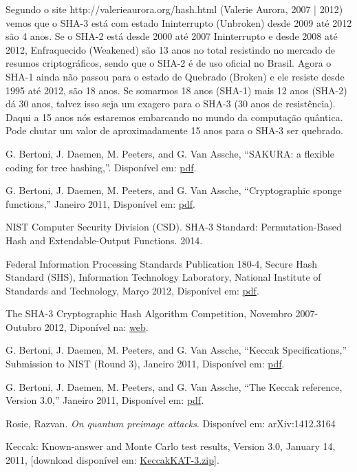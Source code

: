 \documentclass[12pt, a4paper]{article}
\begin{document}
\begin{enumerate}
\begin{enumerate}
    Segundo o site http://valerieaurora.org/hash.html (Valerie Aurora, 2007 |
    2012) vemos que o SHA-3 está com estado Ininterrupto (Unbroken) desde 2009
    até 2012 são 4 anos. Se o SHA-2 está desde 2000 até 2007 Ininterrupto e
    desde 2008 até 2012, Enfraquecido (Weakened) são 13 anos no total resistindo
    no mercado de resumos criptográficos, sendo que o SHA-2 é de uso oficial no
    Brasil. Agora o SHA-1 ainda não passou para o estado de Quebrado (Broken) e
    ele resiste desde 1995 até 2012, são 18 anos. Se somarmos 18 anos (SHA-1)
    mais 12 anos (SHA-2) dá 30 anos, talvez isso seja um exagero para o SHA-3
    (30 anos de resistência). Daqui a 15 anos nós estaremos embarcando no mundo
    da computação quântica. Pode chutar um valor de aproximadamente 15 anos para
    o SHA-3 ser quebrado.

  \end{enumerate}

\end{enumerate}

\pagebreak
\begin{thebibliography}{9}
 G. Bertoni, J. Daemen, M. Peeters, and G. Van Assche, “SAKURA:
a flexible coding for tree hashing,”. Disponível em:
\href{http://keccak.noekeon.org/Sakura.pdf}{pdf}.

 G. Bertoni, J. Daemen, M. Peeters, and G. Van Assche,
“Cryptographic sponge functions,” Janeiro 2011, Disponível em:
\href{http://sponge.noekeon.org/CSF-0.1.pdf}{pdf}.

 NIST Computer Security Division (CSD). SHA-3 Standard:
Permutation-Based Hash and Extendable-Output Functions. 2014.

 Federal Information Processing Standards Publication 180-4,
Secure Hash Standard (SHS), Information Technology Laboratory, National
Institute of Standards and Technology, Março 2012, Disponível em:
\href{http://csrc.nist.gov/publications/fips/fips180-4/fips-180-4.pdf}{pdf}.

 The SHA-3 Cryptographic Hash Algorithm Competition, Novembro
2007-Outubro 2012, Diponível na:
\href{http://csrc.nist.gov/groups/ST/hash/sha-3/index.html}{web}.

 G. Bertoni, J. Daemen, M. Peeters, and G. Van Assche, “Keccak
Specifications,” Submission to NIST (Round 3), Janeiro 2011, Disponível em:
\href{http://keccak.noekeon.org/Keccak-submission-3.pdf}{pdf}.

 G. Bertoni, J. Daemen, M. Peeters, and G. Van Assche, “The
Keccak reference, Version 3.0,” Janeiro 2011, Disponível em:
\href{http://keccak.noekeon.org/Keccak-reference-3.0.pdf}{pdf}.

 Rosie, Razvan. \textit{On quantum preimage attacks}.
Disponível em: arXiv:1412.3164

 Keccak: Known-answer and Monte Carlo test results, Version
3.0, January 14, 2011, [download disponível em:
\href{http://keccak.noekeon.org/KeccakKAT-3.zip}{KeccakKAT-3.zip}].
\end{thebibliography}
\end{document}
